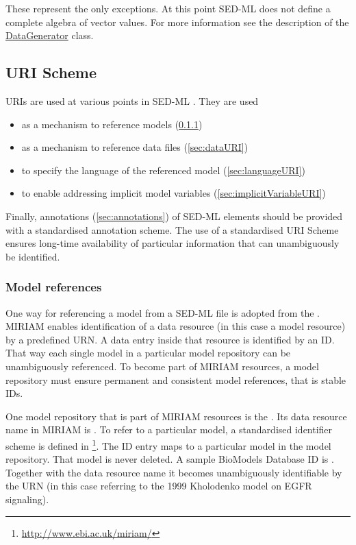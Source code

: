 These represent the only exceptions. At this point SED-ML \currentLV does not define a complete algebra of vector values. For more information see the description of the \hyperref[class:dataGenerator]{DataGenerator} class.
  
  
\subsection{URI Scheme}  
\label{sec:uriScheme}

URIs are used at various points in SED-ML \currentLV. They are used 
\begin{itemize}
	\item as a mechanism to reference models (\ref{sec:modelURI})
	\item as a mechanism to reference data files (\ref{sec:dataURI})
	\item to specify the language of the referenced model (\ref{sec:languageURI})
	\item to enable addressing implicit model variables (\ref{sec:implicitVariableURI})
\end{itemize}

Finally, annotations (\ref{sec:annotations}) of SED-ML elements should be provided with a standardised annotation scheme. The use of a standardised URI Scheme ensures long-time availability of particular information that can unambiguously be identified. 

\subsubsection{Model references}
\label{sec:modelURI}
One way for referencing a model from a SED-ML file is adopted from the . MIRIAM enables identification of a data resource (in this case a model resource) by a predefined URN. A data entry inside that resource is identified by an ID. That way each single  model  in a particular model repository can be unambiguously referenced. To become part of MIRIAM resources, a model repository must ensure permanent and consistent model references, that is stable IDs.

One model repository that is part of MIRIAM resources is the  \citep{LDR+10}. Its data resource name in MIRIAM is . To refer to a particular model, a standardised identifier scheme is defined in \footnote{\url{http://www.ebi.ac.uk/miriam/}}. The ID entry maps to a particular model in the model repository. That model is never deleted. A sample BioModels Database ID is . Together with the data resource name it becomes unambiguously identifiable by the URN  (in this case referring to the 1999 Kholodenko model on EGFR signaling). 

